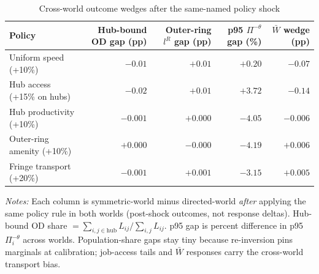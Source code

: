 \documentclass[12pt]{article}
\newcommand{\Wbar}{\bar W}
\begin{document}
\begin{table}[htbp]
  \centering
  \caption{Cross-world outcome wedges after the same-named policy shock}
  \label{tab:policy_outcomes}
  \small
  \begin{tabular}{lrrrr}
  \toprule
  Policy & Hub-bound OD gap (pp) & Outer-ring $l^R$ gap (pp) & p95 $\Pi^{- \theta}$ gap (\%) & $\Wbar$ wedge (pp) \\
  \midrule
  Uniform speed (+10\%)      & $-0.01$ & $+0.01$ & $+0.20$ & $-0.07$ \\
  Hub access (+15\% on hubs) & $-0.02$ & $+0.01$ & $+3.72$ & $-0.14$ \\
  Hub productivity (+10\%)   & $-0.001$ & $+0.000$ & $-4.05$ & $-0.006$ \\
  Outer-ring amenity (+10\%) & $+0.000$ & $-0.000$ & $-4.19$ & $+0.006$ \\
  Fringe transport (+20\%)   & $-0.001$ & $+0.001$ & $-3.15$ & $+0.005$ \\
  \bottomrule
  \end{tabular}
  \vspace{0.4em}

  \begin{minipage}{0.92\textwidth}
  \footnotesize
  \emph{Notes:} Each column is symmetric-world minus directed-world \emph{after} applying
  the same policy rule in both worlds (post-shock outcomes, not response deltas).
  Hub-bound OD share $=\sum_{i,j\in\mathrm{hub}} L_{ij}/\sum_{i,j}L_{ij}$.
  p95 gap is percent difference in p95 $\Pi_i^{-\theta}$ across worlds.
  Population-share gaps stay tiny because re-inversion pins marginals at calibration;
  job-access tails and $\Wbar$ responses carry the cross-world transport bias.
  \end{minipage}
\end{table}
\end{document}
